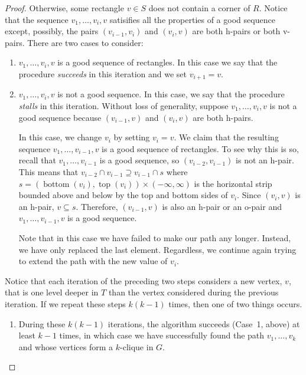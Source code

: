 \documentclass[lotsofwhite]{patmorin}
\DeclareMathOperator{\tp}{top}
\DeclareMathOperator{\bttom}{bottom}
\begin{document}
\begin{proof}
  Otherwise, some rectangle $v\in S$ does not contain a corner of $R$.
  Notice that the sequence $v_1,\ldots,v_i,v$ satisifies all the
  properties of a good sequence except, possibly, the pairs $(v_{i-1},v_i)$
  and $(v_i,v)$ are both h-pairs or both v-pairs.  There are two cases
  to consider:
  \begin{enumerate}
     \item $v_1,\ldots,v_i,v$ is a good sequence of rectangles. In this
        case we say that the procedure \emph{succeeds} in this iteration
        and we set $v_{i+1}=v$.
     
     \item  $v_1,\ldots,v_i,v$ is not a good sequence.  In this case,
       we say that the procedure \emph{stalls} in this iteration.
       Without loss of generality, suppose $v_1,\ldots,v_i,v$ is not a
       good sequence because $(v_{i-1},v)$ and $(v_i,v)$ are both h-pairs.

       In this case, we change $v_i$ by setting $v_i=v$. We claim
       that the resulting sequence $v_1,\ldots,v_{i-1},v$ is a good
       sequence of rectangles.  To see why this is so, recall that
       $v_1,\ldots,v_{i-1}$ is a good sequence, so $(v_{i-2},v_{i-1})$
       is not an h-pair.  This means that $v_{i-2}\cap v_{i-1}
       \supseteq v_{i-1}\cap s$ where $s=(\bttom(v_i),\tp(v_i))\times
       (-\infty,\infty)$ is the horizontal strip bounded above and
       below by the top and bottom sides of $v_i$.  Since $(v_{i},v)$
       is an h-pair, $v\subseteq s$.  Therefore, $(v_{i-1},v)$ is also
       an h-pair or an o-pair and $v_1,\ldots,v_{i-1},v$ is a good sequence.

       Note that in this case we have failed to make our path any
       longer. Instead, we have only replaced the last element.
       Regardless, we continue again trying to extend the path with the
       new value of $v_i$.
  \end{enumerate}
  Notice that each iteration of the preceding two steps considers a new
  vertex, $v$, that is one level deeper in $T$ than the vertex considered
  during the previous iteration.  If we repeat these steps $k(k-1)$
  times, then one of two things occurs.
  \begin{enumerate}
     \item During these $k(k-1)$ iterations, the algorithm succeeds
     (Case~1, above) at least $k-1$ times, in which case we have
     successfully found the path $v_1,\ldots,v_k$ and whose vertices
     form a $k$-clique in $G$.


\end{enumerate}
\end{proof}
\end{document}
